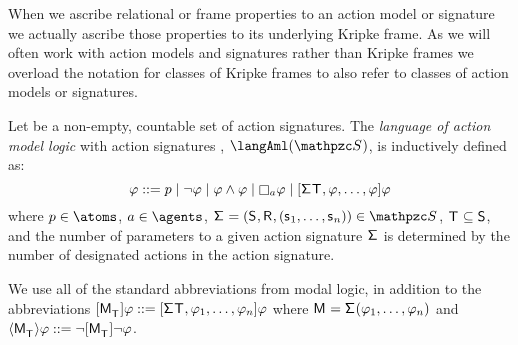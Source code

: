 When we ascribe relational or frame properties to an action model or signature we actually ascribe those properties to its underlying Kripke frame.
As we will often work with action models and signatures rather than Kripke frames we overload the notation for classes of Kripke frames to also refer to classes of action models or signatures.

\begin{definition}
Let \aSignatureFamily{} be a non-empty, countable set of action signatures.
The {\em language of action model logic} with action signatures \aSignatureFamily{}, $\langAml(\aSignatureFamily)$, is inductively defined as:
$$
\phi ::=
    \atomP \mid
    \lnot \phi \mid
    \phi \land \phi \mid
    \necessaryA \phi \mid
    \actionA{\aSignature \aStatesT, \phi, \dots, \phi} \phi
$$
where $\atomP \in \atoms$, $\agentA \in \agents$, $\aSignatureAndTuple \in \aSignatureFamily$, $\aStatesT \subseteq \aStates$, and the number of parameters to a given action signature $\aSignature$ is determined by the number of designated actions in the action signature.
\end{definition}

We use all of the standard abbreviations from modal logic, in addition to the abbreviations 
$\actionA{\aPModel{\aStatesT}} \phi ::= \actionA{\aSignature \aStatesT, \phi_1, \dots, \phi_n} \phi$ where $\aModel = \aSignature(\phi_1, \dots, \phi_n)$ and 
$\actionE{\aPModel{\aStatesT}} \phi ::= \lnot \actionA{\aPModel{\aStatesT}} \lnot \phi$.

